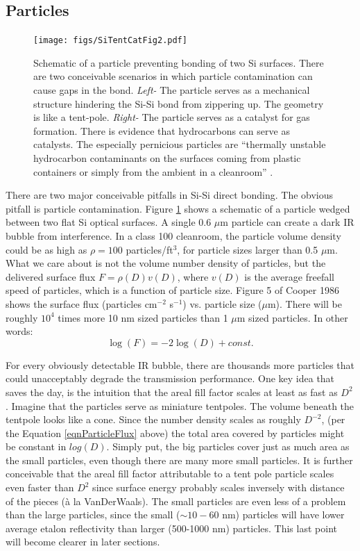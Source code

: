 \documentclass[osajnl,preprint,showpacs,superscriptaddress,12pt]{revtex4-1} %
\begin{document}
\subsection{Particles}

\begin{figure}[htbp]
\centerline{\texttt{[image: figs/SiTentCatFig2.pdf]}}
\caption{Schematic of a particle preventing bonding of two Si surfaces\label{figParticle}.  There are two conceivable scenarios in which particle contamination can cause gaps in the bond.  \emph{Left-} The particle serves as a mechanical structure hindering the Si-Si bond from zippering up.  The geometry is like a tent-pole.  \emph{Right-} The particle serves as a catalyst for gas formation.  There is evidence that hydrocarbons can serve as catalysts.  The especially pernicious particles are ``thermally unstable hydrocarbon contaminants on the surfaces coming from plastic containers or simply from the ambient in a cleanroom'' \cite{1998AnRMS..28..215G}. }
\end{figure}

There are two major conceivable pitfalls in Si-Si direct bonding.  The obvious pitfall is particle contamination.  Figure \ref{figParticle} shows a schematic of a particle wedged between two flat Si optical surfaces.  A single 0.6 $\mu$m particle can create a dark IR bubble from interference.  In a class 100 cleanroom, the particle volume density could be as high as $\rho=100$ particles/ft$^3$, for particle sizes larger than 0.5 $\mu$m.  What we care about is not the volume number density of particles, but the delivered surface flux $F=\rho(D) v(D)$, where $v(D)$ is the average freefall speed of particles, which is a function of particle size.  Figure 5 of Cooper 1986\cite{doi:10.1080/02786828608959094} shows the surface flux (particles cm$^{-2}$ s$^{-1}$) vs. particle size ($\mu$m).  There will be roughly $10^4$ times more 10 nm sized particles than 1 $\mu$m sized particles.  In other words:
$$\log(F) = -2\log(D) + const. \label{eqnParticleFlux}$$

For every obviously detectable IR bubble, there are thousands more particles that could unacceptably degrade the transmission performance.  One key idea that saves the day, is the intuition that the areal fill factor scales at least as fast as $D^2$.  Imagine that the particles serve as miniature tentpoles.  The volume beneath the tentpole looks like a cone.  Since the number density scales as roughly $D^{-2}$, (per the Equation \ref{eqnParticleFlux} above) the total area covered by particles might be constant in $log(D)$.  Simply put, the big particles cover just as much area as the small particles, even though there are many more small particles.  It is further conceivable that the areal fill factor attributable to a tent pole particle scales even faster than $D^2$ since surface energy probably scales inversely with distance of the pieces (\`a la VanDerWaals).  The small particles are even less of a problem than the large particles, since the small ($\sim10-60$ nm) particles will have lower average etalon reflectivity than larger (500-1000 nm) particles.  This last point will become clearer in later sections.
\end{document}
